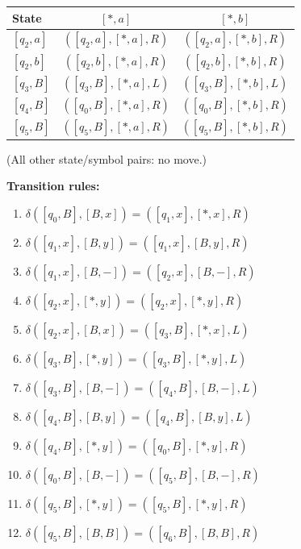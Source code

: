 \documentclass[11pt,a4paper]{article}
\begin{document}
\begin{solution}
\begin{center}
\medskip
\begin{tabular}{l|cc}\toprule
State & $[\ast,a]$ & $[\ast,b]$\\\midrule
$[q_2,a]$ & $([q_2,a],[\ast,a],R)$ & $([q_2,a],[\ast,b],R)$\\
$[q_2,b]$ & $([q_2,b],[\ast,a],R)$ & $([q_2,b],[\ast,b],R)$\\
$[q_3,B]$ & $([q_3,B],[\ast,a],L)$ & $([q_3,B],[\ast,b],L)$\\
$[q_4,B]$ & $([q_0,B],[\ast,a],R)$ & $([q_0,B],[\ast,b],R)$\\
$[q_5,B]$ & $([q_5,B],[\ast,a],R)$ & $([q_5,B],[\ast,b],R)$\\\bottomrule
\end{tabular}\end{center}
(All other state/symbol pairs: no move.)
\par\noindent\textbf{Transition rules:}
{\small\begin{enumerate}[label=\arabic*.,itemsep=0pt]
\item $\delta([q_0,B],[B,x])=([q_1,x],[\ast,x],R)$
\item $\delta([q_1,x],[B,y])=([q_1,x],[B,y],R)$
\item $\delta([q_1,x],[B,-])=([q_2,x],[B,-],R)$
\item $\delta([q_2,x],[\ast,y])=([q_2,x],[\ast,y],R)$
\item $\delta([q_2,x],[B,x])=([q_3,B],[\ast,x],L)$
\item $\delta([q_3,B],[\ast,y])=([q_3,B],[\ast,y],L)$
\item $\delta([q_3,B],[B,-])=([q_4,B],[B,-],L)$
\item $\delta([q_4,B],[B,y])=([q_4,B],[B,y],L)$
\item $\delta([q_4,B],[\ast,y])=([q_0,B],[\ast,y],R)$
\item $\delta([q_0,B],[B,-])=([q_5,B],[B,-],R)$
\item $\delta([q_5,B],[\ast,y])=([q_5,B],[\ast,y],R)$
\item $\delta([q_5,B],[B,B])=([q_6,B],[B,B],R)$
\end{enumerate}}
\end{solution}
\end{document}
